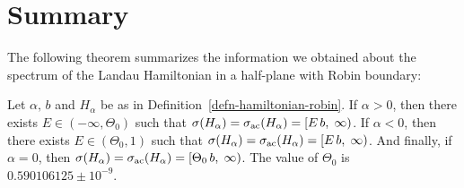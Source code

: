 \section{Summary}
The following theorem summarizes the information we obtained about the spectrum of the Landau Hamiltonian in a half-plane with Robin boundary:
\begin{thm}
    Let $\alpha, \, b$ and $H_\alpha$ be as in Definition~\ref{defn-hamiltonian-robin}. If $\alpha > 0$, then there exists $E \in (-\infty, \Theta_0)$ such that $ \sigma(H_\alpha) = \sigma_{\mathrm{ac}}(H_\alpha) = [E \, b, \; \infty )$.
    If $\alpha < 0$, then there exists $E \in (\Theta_0, 1)$ such that $\sigma(H_\alpha) = \sigma_{\mathrm{ac}}(H_\alpha) = [E \, b, \; \infty )$.
    And finally, if $\alpha = 0$, then $\sigma(H_\alpha) = \sigma_{\mathrm{ac}}(H_\alpha) = [\Theta_0 \, b, \; \infty )$. The value of $\Theta_0$ is $0.590106125 \pm 10^{-9}$.
\end{thm}


